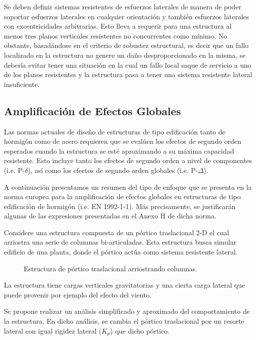 Se deben definir sistemas resistentes de esfuerzos laterales de manera de poder soportar esfuerzos laterales en cualquier orientación y también esfuerzos laterales con excentricidades arbitrarias. Esto lleva a requerir para una estructura al menos tres planos verticales resistentes no concurrentes como mínimo. No obstante, basadándose en el criterio de robustez estructural, es decir que un fallo localizado en la estructura no genere un daño desproporcionado en la misma, se debería evitar tener una situación en la cual un fallo local saque de servicio a uno de los planos resistentes y la estructura pasa a tener una sistema resistente lateral insuficiente.


\subsection{Amplificación de Efectos Globales}

Las normas actuales de diseño de estructuras de tipo edificación tanto de hormigón como de acero requieren que se evalúen los efectos de segundo orden esperados cuando la estructura se esté aproximando a su máxima capacidad resistente. Esto incluye tanto los efectos de segundo orden a nivel de componentes (i.e. P-$\delta$), así como los efectos de segundo orden globales (i.e. P-$\Delta$).

A continuación presentamos un resumen del tipo de enfoque que se presenta en la norma europea para la amplificación de efectos globales en estructuras de tipo edificación de hormigón (i.e. EN 1992-1-1). Más precisamente, se justificarán algunas de las expresiones presentadas en el Anexo H de dicha norma.

Considere una estructura compuesta de un pórtico traslacional 2-D el cual arriostra una serie de columnas bi-articuladas. Esta estructura busca simular edificio de una planta, donde el pórtico actúa como sistema resistente lateral.

\begin{figure}[htb]
  \centering
  \def\svgwidth{0.8\textwidth}
  
	\caption{Estructura de pórtico traslacional arriostrando columnas.}
	\label{fig:globales}
\end{figure}

La estructura tiene cargas verticales gravitatorias y una cierta carga lateral que puede provenir por ejemplo del efecto del viento.

Se propone realizar un análisis simplificado y aproximado del comportamiento de la estructura. En dicho análisis, se cambia el pórtico traslacional por un resorte lateral con igual rigidez lateral ($K_{p}$) que dicho pórtico.


